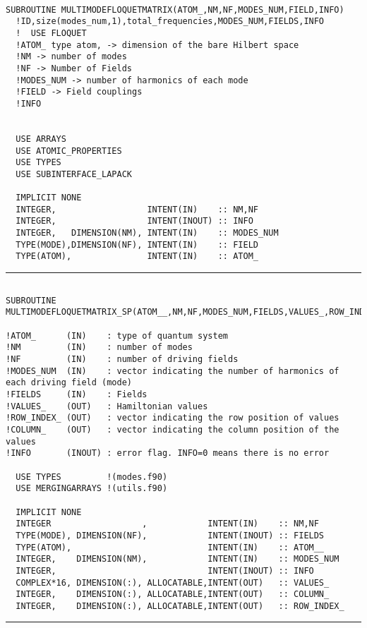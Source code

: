 \documentclass[10pt,a4paper]{article}
\begin{document}
\begin{verbatim}

SUBROUTINE MULTIMODEFLOQUETMATRIX(ATOM_,NM,NF,MODES_NUM,FIELD,INFO)
  !ID,size(modes_num,1),total_frequencies,MODES_NUM,FIELDS,INFO
  !  USE FLOQUET
  !ATOM_ type atom, -> dimension of the bare Hilbert space
  !NM -> number of modes
  !NF -> Number of Fields
  !MODES_NUM -> number of harmonics of each mode
  !FIELD -> Field couplings
  !INFO


  USE ARRAYS
  USE ATOMIC_PROPERTIES
  USE TYPES
  USE SUBINTERFACE_LAPACK

  IMPLICIT NONE
  INTEGER,                  INTENT(IN)    :: NM,NF
  INTEGER,                  INTENT(INOUT) :: INFO
  INTEGER,   DIMENSION(NM), INTENT(IN)    :: MODES_NUM
  TYPE(MODE),DIMENSION(NF), INTENT(IN)    :: FIELD
  TYPE(ATOM),               INTENT(IN)    :: ATOM_                       
\end{verbatim}
\begin{center}
\rule{12cm}{1pt}
\end{center}
\begin{verbatim}

SUBROUTINE MULTIMODEFLOQUETMATRIX_SP(ATOM__,NM,NF,MODES_NUM,FIELDS,VALUES_,ROW_INDEX_,COLUMN_,INFO)

!ATOM_      (IN)    : type of quantum system
!NM         (IN)    : number of modes
!NF         (IN)    : number of driving fields
!MODES_NUM  (IN)    : vector indicating the number of harmonics of each driving field (mode)
!FIELDS     (IN)    : Fields
!VALUES_    (OUT)   : Hamiltonian values
!ROW_INDEX_ (OUT)   : vector indicating the row position of values
!COLUMN_    (OUT)   : vector indicating the column position of the values
!INFO       (INOUT) : error flag. INFO=0 means there is no error

  USE TYPES         !(modes.f90)
  USE MERGINGARRAYS !(utils.f90)
  
  IMPLICIT NONE
  INTEGER                  ,            INTENT(IN)    :: NM,NF
  TYPE(MODE), DIMENSION(NF),            INTENT(INOUT) :: FIELDS
  TYPE(ATOM),                           INTENT(IN)    :: ATOM__
  INTEGER,    DIMENSION(NM),            INTENT(IN)    :: MODES_NUM
  INTEGER,                              INTENT(INOUT) :: INFO
  COMPLEX*16, DIMENSION(:), ALLOCATABLE,INTENT(OUT)   :: VALUES_
  INTEGER,    DIMENSION(:), ALLOCATABLE,INTENT(OUT)   :: COLUMN_
  INTEGER,    DIMENSION(:), ALLOCATABLE,INTENT(OUT)   :: ROW_INDEX_

\end{verbatim}
\begin{center}
\rule{12cm}{1pt}
\end{center}
\end{document}
